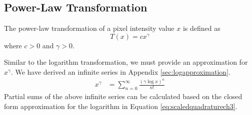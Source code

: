 \subsection{Power-Law Transformation}
The power-law transformation of a pixel intensity value $x$ is defined as
\begin{equation}
    T\left(x\right) = cx^{\gamma}
\end{equation}
where $c>0$ and $\gamma > 0$.

Similar to the logarithm transformation, we must provide an approximation for $x^\gamma$.
We have derived an infinite series in Appendix \ref{sec:logapproximation}.
\begin{align*}
	x^\gamma &= \sum_{n=0}^{\infty}{\frac{(\gamma\log{x})^n}{n!}}
\end{align*}
Partial sums of the above infinite series can be calculated based on the closed form approximation for the logarithm in Equation \ref{eq:scaledquadraturech3}.
